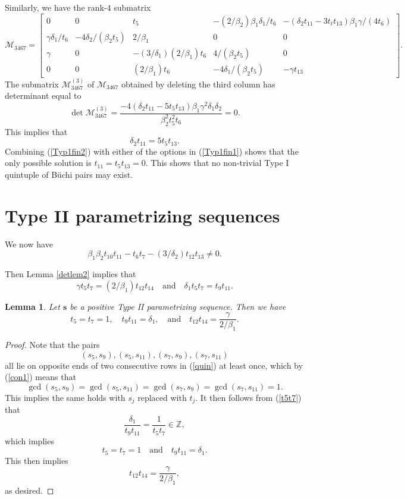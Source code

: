 \documentclass[letterpaper,10pt]{amsart}
\newcommand{\bZ}{{\mathbb{Z}}}
\newcommand{\Bs}{{\mathbf{s}}}
\newcommand{\M}{{\mathcal{M}}}
\newtheorem{lemma}[theorem]{Lemma}
\theoremstyle{definition}
\numberwithin{equation}{section}
\begin{document}
Similarly, we have the rank-$4$ submatrix
\[\M_{3467} =\begin{bmatrix} 0 & 0 & t_5 & -(2/\beta_2) \beta_1 \delta_1/t_6 & - (\delta_2 t_{11} - 3 t_t t_{13}) \beta_1 \gamma/(4 t_6) \\
\gamma \delta_1/t_6 & - 4 \delta_2/(\beta_2 t_5) & 2/\beta_1 & 0 & 0 \\
\gamma & 0 & - (3/\delta_1)(2/\beta_1) t_6 & 4/(\beta_2 t_5) & 0 \\
0 & 0 & (2/\beta_1) t_6 & - 4 \delta_1/(\beta_2 t_5) & - \gamma t_{13}  \end{bmatrix}. \]
The submatrix $\M_{3467}^{(3)}$ of $\M_{3467}$ obtained by deleting the third column has determinant equal to 
\[\det \M_{3467}^{(3)} = \frac{-4 (\delta_2 t_{11} - 5 t_5 t_{13})  \beta_1 \gamma^2 \delta_1 \delta_2}{\beta_2^2 t_5^2 t_6} = 0.\]
This implies that 
\begin{equation} \label{Typ1fin2} \delta_2 t_{11} = 5 t_5 t_{13}.\end{equation}
Combining (\ref{Typ1fin2}) with either of the options in (\ref{Typ1fin1}) shows that the only possible solution is $t_{11} = t_5 t_{13} = 0$. This shows that no non-trivial Type I quintuple of  B\"{u}chi pairs may exist.

\section{Type II parametrizing sequences} 
\label{Typ2} 

We now have
\begin{equation} \label{case2m}  \beta_1 \beta_2 t_{10} t_{11} - t_6 t_7 -  (3/\delta_2) t_{12} t_{13} \ne 0.
\end{equation} 

Then Lemma \ref{detlem2} implies that 
\begin{equation} \label{t5t7} \gamma t_5 t_7 = (2/\beta_1) t_{12} t_{14} \quad \text{and} \quad \delta_1 t_5 t_7 = t_9 t_{11}.\end{equation}

\begin{lemma} \label{gcdlem2} Let $\Bs$ be a positive Type II parametrizing sequence. Then we have 
\[t_5 = t_7 = 1, \quad t_9 t_{11} = \delta_1, \quad \text{and} \quad t_{12} t_{14} = \frac{\gamma}{2/\beta_1}.\]
\end{lemma}

\begin{proof} 

Note that the pairs 
\[(s_5, s_9), (s_5, s_{11}), (s_7, s_9), (s_7, s_{11})\]
all lie on opposite ends of two consecutive rows in (\ref{quin}) at least once, which by (\ref{con1}) means that 
\[\gcd(s_5, s_9) = \gcd(s_5, s_{11}) = \gcd(s_7, s_9) = \gcd(s_7, s_{11}) = 1.\]
This implies the same holds with $s_j$ replaced with $t_j$. It then follows from (\ref{t5t7}) that 
\[\frac{\delta_1}{t_9 t_{11}} = \frac{1}{t_5 t_7} \in \bZ,\]
which implies
\[t_5 = t_7 = 1\quad \text{and} \quad t_9 t_{11} = \delta_1.\]
This then implies 
\[t_{12} t_{14} = \frac{\gamma}{2/\beta_1},\]
as desired. \end{proof} 
\end{document}

